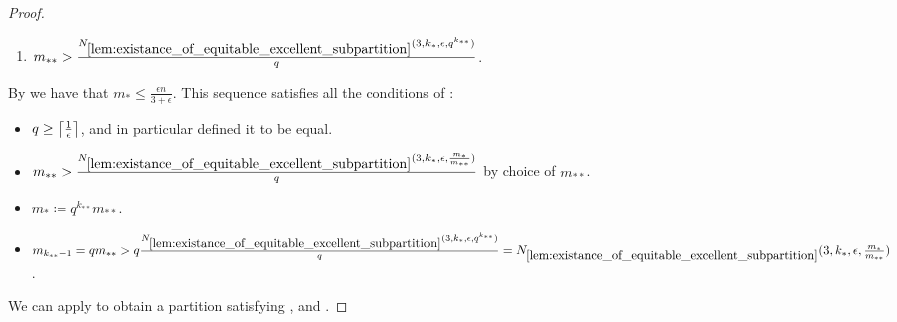 \begin{theorem}[Theorem 5.18]
\begin{proof}
\begin{enumerate}[label=(\alph*), ref=\alph*]
                \item \label{itm:minimal_conditions_for_excellent_partitions.c} $m_{**} > \frac{N_{\ref{lem:existance_of_equitable_excellent_subpartition}}
                    ( 3, k_*, \epsilon, q^{k_{**}} )}{q}$.
            \end{enumerate}
            By  we have that $m_* \leq \frac{\epsilon n}{3 + \epsilon}$.
            This sequence satisfies all the conditions of :
            \begin{itemize}[label={}]
                \item {}
                    $q \geq \left\lceil \frac{1}{\epsilon} \right\rceil$, and in particular defined it to be equal.
                \item {}
                        $m_{**} > \frac{N_{\ref{lem:existance_of_equitable_excellent_subpartition}}
                            ( 3, k_*, \epsilon, \frac{m_*}{m_{**}} )}{q}$ by choice of $m_{**}$.
                \item {}
                    $m_* \coloneqq q^{k_{**}} m_{**}$.
                \item {} $m_{k_{**}-1} = q m_{**} >
                    q \frac{N_{\ref{lem:existance_of_equitable_excellent_subpartition}}( 3, k_*, \epsilon, q^{k_{**}} )}{q} =
                    N_{\ref{lem:existance_of_equitable_excellent_subpartition}}( 3, k_*, \epsilon, \frac{m_*}{m_{**}} )$.
            \end{itemize}
            We can apply  to obtain a partition
            satisfying ,
             and
            .


\end{proof}
\end{theorem}
